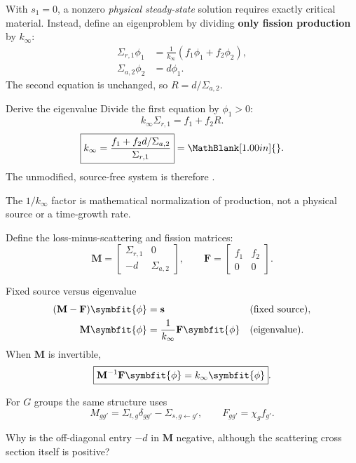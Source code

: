 \newpage
\begin{handoutcolumns}
With $s_1=0$, a nonzero \emph{physical steady-state} solution
requires exactly critical material. Instead, define an eigenproblem
by dividing \textbf{only fission production} by $k_{\infty}$:
\begin{align*}
 \Sigma_{r,1}\phi_1&=
      \frac{1}{k_{\infty}}(f_1\phi_1+f_2\phi_2),\\
 \Sigma_{a,2}\phi_2&=d\phi_1.
\end{align*}
The second equation is unchanged, so $R=d/\Sigma_{a,2}$.
\begin{boardbox}{Derive the eigenvalue}
Divide the first equation by $\phi_1>0$:
\[
 k_{\infty}\Sigma_{r,1}=f_1+f_2R.
\]
\[
 \boxed{k_{\infty}=\frac{f_1+f_2d/\Sigma_{a,2}}{\Sigma_{r,1}}}
 =\MathBlank[1.00in]{}.
\]
The unmodified, source-free system is therefore
\RevealBlank[1.15in]{}.
\end{boardbox}
The $1/k_{\infty}$ factor is mathematical normalization of
production, not a physical source or a time-growth rate.

Define the loss-minus-scattering and fission matrices:
\[
 \mathbf M=
 \begin{bmatrix}\Sigma_{r,1}&0\\-d&\Sigma_{a,2}\end{bmatrix},
 \qquad
 \mathbf F=
 \begin{bmatrix}f_1&f_2\\0&0\end{bmatrix}.
\]
\begin{fixedbox}{Fixed source versus eigenvalue}
\begin{align*}
 (\mathbf M-\mathbf F)\symbfit{\phi}&=\mathbf s
           &&\text{(fixed source)},\\
 \mathbf M\symbfit{\phi}&=\frac1{k_{\infty}}
                   \mathbf F\symbfit{\phi}
           &&\text{(eigenvalue)}.
\end{align*}
When $\mathbf M$ is invertible,
\[
 \boxed{\mathbf M^{-1}\mathbf F\symbfit{\phi}
       =k_{\infty}\symbfit{\phi}}.
\]
\end{fixedbox}
For $G$ groups the same structure uses
\[
 M_{gg'}=\Sigma_{t,g}\delta_{gg'}-\Sigma_{s,g\gets g'},
 \qquad F_{gg'}=\chi_g f_{g'}.
\]
\begin{checkpoint}
Why is the off-diagonal entry $-d$ in $\mathbf M$ negative,
although the scattering cross section itself is positive?
\end{checkpoint}


\end{handoutcolumns}
